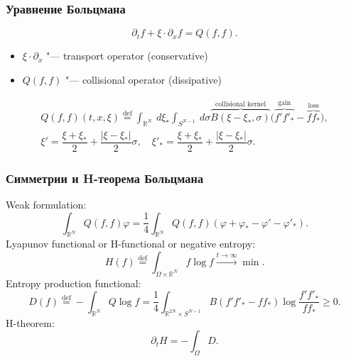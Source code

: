 \documentclass[mathserif]{beamer} %
\newcommand{\eqdef}{\overset{\mathrm{def}}{=}}
\newcommand{\dd}{\:d}%
\newcommand{\pder}[2][]{\partial_{#2}{#1}}
\newcommand{\dxi}{\dd\xi}
\renewcommand{\phi}{\varphi}
\begin{document}
\begin{frame}
    \frametitle{Уравнение Больцмана}
    \begin{equation*}
        \pder[f]{t} + \xi\cdot\pder[f]{x} = Q(f,f).
    \end{equation*}

    \begin{itemize} %
        \item \(\xi\cdot\pder{x}\) "--- transport operator (conservative)
        \item \(Q(f,f)\) "--- collisional operator (dissipative)
    \end{itemize}

    \begin{gather*}
        Q(f,f)(t,x,\xi) \eqdef \int_{\mathbb{R}^N}\dxi_* \int_{S^{N-1}} \dd\sigma
        \overbrace{B(\xi-\xi_*,\sigma)}^\text{collisional kernel}
        \Big( \overbrace{f'f'_*}^\text{gain} - \overbrace{ff_*}^\text{loss} \Big), \\
        \xi' = \dfrac{\xi+\xi_*}2 + \dfrac{|\xi-\xi_*|}2\sigma, \quad
        \xi'_* = \dfrac{\xi+\xi_*}2 + \dfrac{|\xi-\xi_*|}2\sigma.
    \end{gather*}

\end{frame}

\begin{frame}
    \frametitle{Симметрии и H-теорема Больцмана}
    Weak formulation:
    \begin{equation*}
        \int_{\mathbb{R}^N} Q(f,f)\phi = \frac14 \int_{\mathbb{R}^N} Q(f,f) (\phi + \phi_* - \phi' - \phi'_*).
    \end{equation*}
    \pause
    Lyapunov functional or H-functional or negative entropy:
    \begin{equation*}
        H(f) \eqdef \int_{\Omega\times\mathbb{R}^N} f\log{f} \xrightarrow{t\to\infty} \min.
    \end{equation*}
    Entropy production functional:
    \begin{equation*}
        D(f) \eqdef -\int_{\mathbb{R}^N} Q\log{f} = \frac14\int_{\mathbb{R}^{2N}\times S^{N-1}}
        B\left( f'f'_* - ff_* \right) \log\frac{f'f'_*}{ff_*} \geq 0.
    \end{equation*}
    H-theorem:
    \begin{equation*}
        \pder[H]{t} = - \int_\Omega D.
    \end{equation*}
\end{frame}
\end{document}
